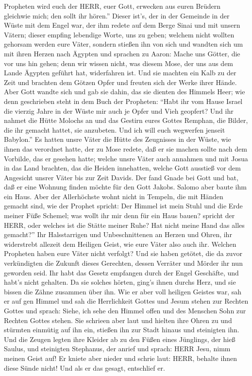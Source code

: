 Propheten wird euch der HERR, euer Gott, erwecken aus euren Brüdern
gleichwie mich; den sollt ihr hören.''  Dieser ist's, der
in der Gemeinde in der Wüste mit dem Engel war, der ihm redete auf dem
Berge Sinai und mit unsern Vätern; dieser empfing lebendige Worte, uns
zu geben;  welchem nicht wollten gehorsam werden eure
Väter, sondern stießen ihn von sich und wandten sich um mit ihren Herzen
nach Ägypten  und sprachen zu Aaron: Mache uns Götter, die
vor uns hin gehen; denn wir wissen nicht, was diesem Mose, der uns aus
dem Lande Ägypten geführt hat, widerfahren ist.  Und sie
machten ein Kalb zu der Zeit und brachten dem Götzen Opfer und freuten
sich der Werke ihrer Hände.  Aber Gott wandte sich und gab
sie dahin, das sie dienten des Himmels Heer; wie denn geschrieben steht
in dem Buch der Propheten: ``Habt ihr vom Hause Israel die vierzig Jahre
in der Wüste mir auch je Opfer und Vieh geopfert?  Und ihr
nahmet die Hütte Molochs an und das Gestirn eures Gottes Remphan, die
Bilder, die ihr gemacht hattet, sie anzubeten. Und ich will euch
wegwerfen jenseit Babylon.''  Es hatten unsre Väter die
Hütte des Zeugnisses in der Wüste, wie ihnen das verordnet hatte, der zu
Mose redete, daß er sie machen sollte nach dem Vorbilde, das er gesehen
hatte;  welche unsre Väter auch annahmen und mit Josua in
das Land brachten, das die Heiden innehatten, welche Gott ausstieß vor
dem Angesicht unsrer Väter bis zur Zeit Davids.  Der fand
Gnade bei Gott und bat, daß er eine Wohnung finden möchte für den Gott
Jakobs.  Salomo aber baute ihm ein Haus.  Aber
der Allerhöchste wohnt nicht in Tempeln, die mit Händen gemacht sind,
wie der Prophet spricht:  Der Himmel ist mein Stuhl und die
Erde meiner Füße Schemel; was wollt ihr mir denn für ein Haus bauen?
spricht der HERR, oder welches ist die Stätte meiner Ruhe? 
Hat nicht meine Hand das alles gemacht?''  Ihr
Halsstarrigen und Unbeschnittenen an Herzen und Ohren, ihr widerstrebt
allezeit dem Heiligen Geist, wie eure Väter also auch ihr. 
Welchen Propheten haben eure Väter nicht verfolgt? Und sie haben
getötet, die da zuvor verkündigten die Zukunft dieses Gerechten, dessen
Verräter und Mörder ihr nun geworden seid.  Ihr habt das
Gesetz empfangen durch der Engel Geschäfte, und habt's nicht gehalten.
 Da sie solches hörten, ging's ihnen durchs Herz, und sie
bissen die Zähne zusammen über ihn.  Wie er aber voll
heiligen Geistes war, sah er auf gen Himmel und sah die Herrlichkeit
Gottes und Jesum stehen zur Rechten Gottes  und sprach:
Siehe, ich sehe den Himmel offen und des Menschen Sohn zur Rechten
Gottes stehen.  Sie schrieen aber laut und hielten ihre
Ohren zu und stürmten einmütig auf ihn ein, stießen ihn zur Stadt hinaus
und steinigten ihn.  Und die Zeugen legten ihre Kleider ab
zu den Füßen eines Jünglings, der hieß Saulus,  und
steinigten Stephanus, der anrief und sprach: HERR Jesu, nimm meinen
Geist auf!  Er kniete aber nieder und schrie laut: HERR,
behalte ihnen diese Sünde nicht! Und als er das gesagt, entschlief er.

